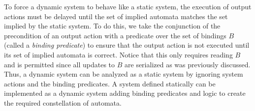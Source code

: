 To force a dynamic system to behave like a static system, the execution of output actions must be delayed until the set of implied automata matches the set implied by the static system.
To do this, we take the conjunction of the precondition of an output action with a predicate over the set of bindings $B$ (called a \emph{binding predicate}) to ensure that the output action is not executed until its set of implied automata is correct.
Notice that this only requires reading $B$ and is permitted since all updates to $B$ are serialized as was previously discussed.
Thus, a dynamic system can be analyzed as a static system by ignoring system actions and the binding predicates.
A system defined statically can be implemented as a dynamic system adding binding predicates and logic to create the required constellation of automata.
